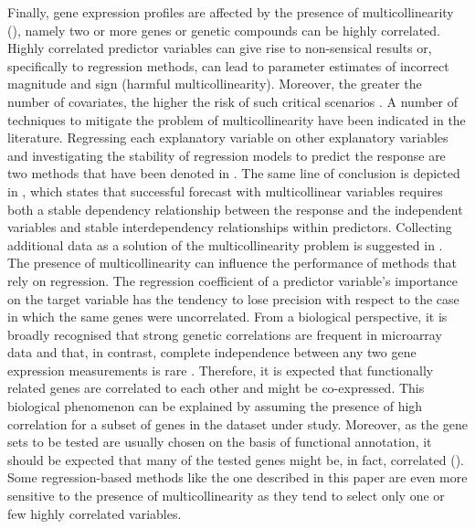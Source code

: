 Finally, gene expression profiles are affected by the presence of multicollinearity (\citealp{est_multicoll, ml_multicoll}), namely two or more genes or genetic compounds can be highly correlated. Highly correlated predictor variables can give rise to non-sensical results or, specifically to regression methods, can lead to parameter estimates of incorrect magnitude and sign (harmful multicollinearity). Moreover, the greater the number of covariates, the higher the risk of such critical scenarios \citealp{multicollinearity_kvs}.  
A number of techniques to mitigate the problem of multicollinearity have been indicated in the literature. Regressing each explanatory variable on other explanatory variables and investigating the stability of regression models to predict the response are two methods that have been denoted in \citealp{multicollinearity_kvs}. The same line of conclusion is depicted in \citealp{farrar1964multicollinearity}, which states that successful forecast with multicollinear variables requires both a stable dependency relationship between the response and the independent variables and stable interdependency relationships within predictors. Collecting additional data as a solution of the multicollinearity problem is suggested in \citealp{multicollinearity_kvs, farrar1964multicollinearity}.
The presence of multicollinearity can influence the performance of methods that rely on regression. The regression coefficient of a predictor variable's importance on the target variable has the tendency to lose precision with respect to the case in which the same genes were uncorrelated. 
From a biological perspective, it is broadly recognised that strong genetic correlations are frequent in microarray data and that, in contrast, complete independence between any two gene expression measurements is rare \citealp{Goeman2007}. Therefore, it is expected that functionally related genes are correlated to each other and might be co-expressed. This biological phenomenon can be explained by assuming the presence of high correlation for a subset of genes in the dataset under study. Moreover, as the gene sets to be tested are usually chosen on the basis of functional annotation, it should be expected that many of the tested genes might be, in fact, correlated (\citealp{genesets}).
Some regression-based methods like the one described in this paper are even more sensitive to the presence of multicollinearity as they tend to select only one or few highly correlated variables.

